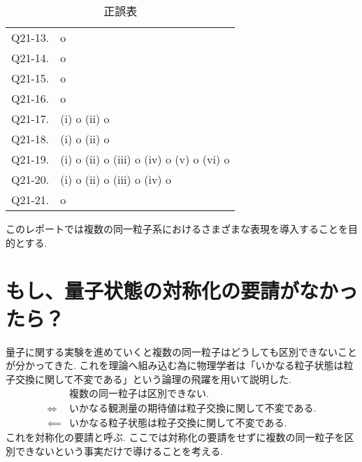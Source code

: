 \documentclass[uplatex,dvipdfmx,a4paper,11pt]{jlreq}
\numberwithin{equation}{section}
\theoremstyle{definition}
\begin{document}
\begin{table}[hbtp]
\begin{tabular}{ll}
    Q21-13. & o                                                                                                                     \\
    Q21-14. & o                                                                                                                     \\
    Q21-15. & o                                                                                                                     \\
    Q21-16. & o                                                                                                                     \\
    Q21-17. & (i) o (ii) o                                                                                                          \\
    Q21-18. & (i) o (ii) o                                                                                                          \\
    Q21-19. & (i) o (ii) o (iii) o (iv) o (v) o (vi) o                                                                              \\
    Q21-20. & (i) o (ii) o (iii) o (iv) o                                                                                           \\
    Q21-21. & o                                                                                                                     \\
    \hline
  \end{tabular}
  \caption{正誤表}
\end{table}
\clearpage

このレポートでは複数の同一粒子系におけるさまざまな表現を導入することを目的とする.

\section{もし、量子状態の対称化の要請がなかったら？}
量子に関する実験を進めていくと複数の同一粒子はどうしても区別できないことが分かってきた. これを理論へ組み込む為に物理学者は「いかなる粒子状態は粒子交換に関して不変である」という論理の飛躍を用いて説明した.
\begin{align}
             & \textrm{複数の同一粒子は区別できない.}            \\
  \iff       & \textrm{いかなる観測量の期待値は粒子交換に関して不変である.} \\
  \impliedby & \textrm{いかなる粒子状態は粒子交換に関して不変である.}
\end{align}
これを対称化の要請と呼ぶ. ここでは対称化の要請をせずに複数の同一粒子を区別できないという事実だけで導けることを考える.
\end{document}
